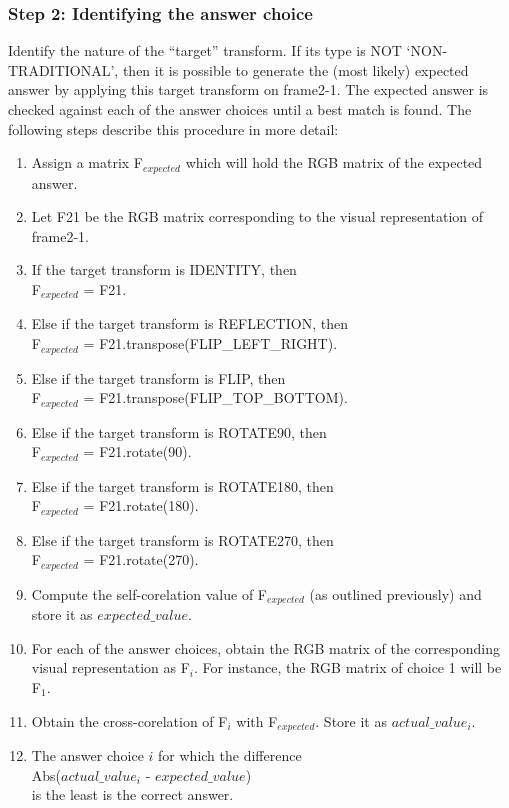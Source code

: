 \documentclass[10pt, letter]{article}
\begin{document}
\subsubsection*{Step 2: Identifying the answer choice}
Identify the nature of the ``target'' transform. If its type is NOT `NON-TRADITIONAL', then it is possible to generate the (most likely) expected answer by applying this target transform on frame2-1. The expected answer is checked against each of the answer choices until a best match is found. The following steps describe this procedure in more detail:
\begin{enumerate}
	\item Assign a matrix F$_{expected}$ which will hold the RGB matrix of the expected answer.
	\item Let F21 be the RGB matrix corresponding to the visual representation of frame2-1.
	\item If the target transform is IDENTITY, then \\
			\hspace*{3cm} F$_{expected}$ = F21.
	\item Else if the target transform is REFLECTION, then \\
			\hspace*{3cm} F$_{expected}$ = F21.transpose(FLIP\_LEFT\_RIGHT).
	\item Else if the target transform is FLIP, then \\
			\hspace*{3cm} F$_{expected}$ = F21.transpose(FLIP\_TOP\_BOTTOM).
	\item Else if the target transform is ROTATE90, then \\
			\hspace*{3cm} F$_{expected}$ = F21.rotate(90).
	\item Else if the target transform is ROTATE180, then \\
			\hspace*{3cm} F$_{expected}$ = F21.rotate(180).
	\item Else if the target transform is ROTATE270, then \\
			\hspace*{3cm} F$_{expected}$ = F21.rotate(270).
	\item Compute the self-corelation value of F$_{expected}$ (as outlined previously) and store it as $expected\_value$.
	\item For each of the answer choices, obtain the RGB matrix of the corresponding visual representation as F$_i$. For instance, the RGB matrix of choice 1 will be F$_1$.
	\item Obtain the cross-corelation of F$_i$ with F$_{expected}$. Store it as $actual\_value_i$.
	\item The answer choice $i$ for which the difference \\
				\hspace*{3cm} Abs($actual\_value_i$ - $expected\_value$) \\
			is the least is the correct answer.
\end{enumerate}
\end{document}
